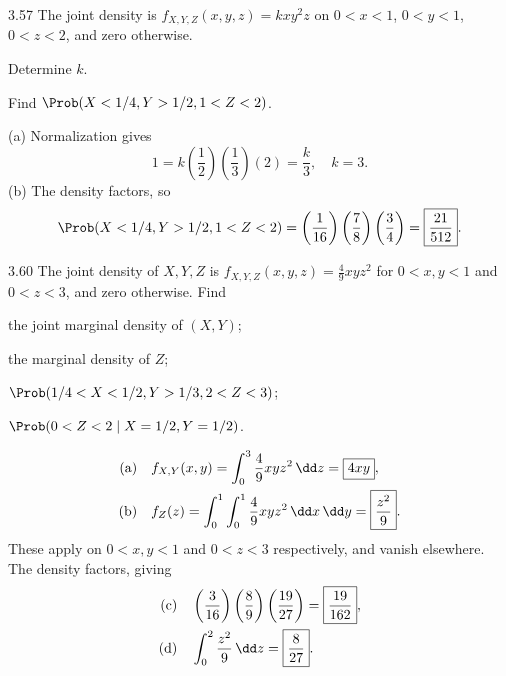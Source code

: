 \documentclass[11pt,oneside]{article}
\begin{document}
\begin{exercise}{3.57}
The joint density is $f_{X,Y,Z}(x,y,z)=kxy^2z$ on $0<x<1$, $0<y<1$, $0<z<2$, and zero otherwise.
\begin{exercisesubparts}
\item Determine $k$.
\item Find $\Prob(X<1/4,Y>1/2,1<Z<2)$.
\end{exercisesubparts}
\end{exercise}

\begin{solution}
\noindent\textup{(a)} Normalization gives
\[
1=k\left(\frac12\right)\left(\frac13\right)(2)=\frac k3,
\quad\boxed{k=3}.
\]
\noindent\textup{(b)} The density factors, so
\[
\Prob(X<1/4,Y>1/2,1<Z<2)
=\left(\frac1{16}\right)\left(\frac78\right)\left(\frac34\right)
=\boxed{\frac{21}{512}}.
\]
\end{solution}

\begin{exercise}{3.60}
The joint density of $X,Y,Z$ is $f_{X,Y,Z}(x,y,z)=\frac49xyz^2$ for $0<x,y<1$ and $0<z<3$, and zero otherwise. Find
\par
\begin{exercisesubparts}
\item the joint marginal density of $(X,Y)$;
\item the marginal density of $Z$;
\item $\Prob(1/4<X<1/2, Y>1/3, 2<Z<3)$;
\item $\Prob(0<Z<2\mid X=1/2,Y=1/2)$. 
\end{exercisesubparts}
\end{exercise}

\begin{solution}
\begin{align*}
\textup{(a)}\quad&f_{X,Y}(x,y)=\int_0^3\frac49xyz^2\,\dd z=\boxed{4xy},\\
\textup{(b)}\quad&f_Z(z)=\int_0^1\int_0^1\frac49xyz^2\,\dd x\,\dd y=\boxed{\frac{z^2}{9}}.
\end{align*}
These apply on $0<x,y<1$ and $0<z<3$ respectively, and vanish elsewhere. The density factors, giving
\begin{align*}
\textup{(c)}\quad&\left(\frac3{16}\right)\left(\frac89\right)\left(\frac{19}{27}\right)=\boxed{\frac{19}{162}},\\
\textup{(d)}\quad&\int_0^2\frac{z^2}{9}\,\dd z=\boxed{\frac8{27}}.
\end{align*}
\end{solution}
\end{document}
